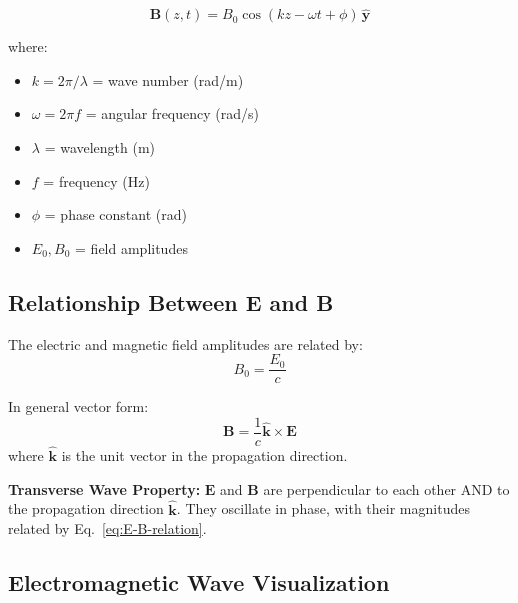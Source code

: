 \begin{equation}
\mathbf{B}(z,t) = B_0 \cos(kz - \omega t + \phi) \, \hat{\mathbf{y}}
\label{eq:plane-wave-B}
\end{equation}

where:
\begin{itemize}
\item $k = 2\pi/\lambda$ = wave number (rad/m)
\item $\omega = 2\pi f$ = angular frequency (rad/s)
\item $\lambda$ = wavelength (m)
\item $f$ = frequency (Hz)
\item $\phi$ = phase constant (rad)
\item $E_0, B_0$ = field amplitudes
\end{itemize}

\subsection{Relationship Between E and B}

The electric and magnetic field amplitudes are related by:
\begin{equation}
B_0 = \frac{E_0}{c}
\label{eq:E-B-relation}
\end{equation}

In general vector form:
\begin{equation}
\mathbf{B} = \frac{1}{c} \hat{\mathbf{k}} \times \mathbf{E}
\label{eq:E-B-vector}
\end{equation}
where $\hat{\mathbf{k}}$ is the unit vector in the propagation direction.

\begin{keyconcept}
\textbf{Transverse Wave Property:} $\mathbf{E}$ and $\mathbf{B}$ are perpendicular to each other AND to the propagation direction $\hat{\mathbf{k}}$. They oscillate in phase, with their magnitudes related by Eq.~\ref{eq:E-B-relation}.
\end{keyconcept}

\subsection{Electromagnetic Wave Visualization}

